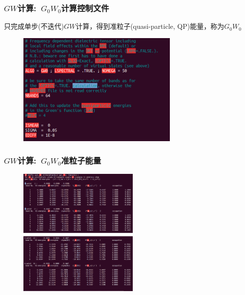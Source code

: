 \frame
{
	\frametitle{$GW$计算:~$G_0W_0$计算控制文件}
	只完成单步(不迭代)$GW$计算，得到准粒子(\textrm{quasi-particle, QP})能量，称为$G_0W_0$%
\begin{figure}[h!]
	\vskip -5pt
\centering
\includegraphics[height=2.2in,viewport=0 10 595 465,clip]{Figures/Si-G0W0-INCAR.png}
\caption{\fontsize{6.2pt}{5.2pt}}%
\label{Si-G0W0-INCAR}
\end{figure}
}

\frame
{
	\frametitle{$GW$计算:~$G_0W_0$准粒子能量}
	\vskip -10pt
\begin{figure}[h!]
\centering
\includegraphics[height=2.5in,viewport=0 40 1190 1240,clip]{Figures/Si-G0W0-OUTCAR.png}
\caption{\fontsize{6.2pt}{5.2pt}}%
\label{Si-G0W0-OUTCAR}
\end{figure}
}

